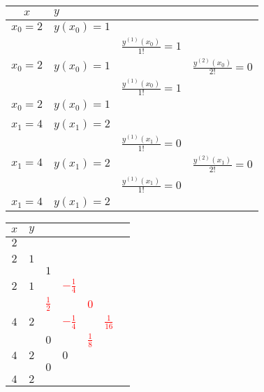 \renewcommand{\arraystretch}{1.0}
\begin{minipage}{10cm}
	\begin{tabular}{|c|lll|}
		\hline
		$x$		&\multicolumn{3}{l|}{$y$}\\
		\hline
		$x_0=2$	&$y(x_0)=1$	&							&\\
				&			&$\frac{y^{(1)}(x_0)}{1!}=1$&\\
		$x_0=2$	&$y(x_0)=1$	&							&$\frac{y^{(2)}(x_0)}{2!}=0$\\
				&			&$\frac{y^{(1)}(x_0)}{1!}=1$&\\
		$x_0=2$	&$y(x_0)=1$	&							&\\
				&			&							&\\
		$x_1=4$	&$y(x_1)=2$	&							&\\
				&			&$\frac{y^{(1)}(x_1)}{1!}=0$&\\
		$x_1=4$	&$y(x_1)=2$	&							&$\frac{y^{(2)}(x_1)}{2!}=0$\\
				&			&$\frac{y^{(1)}(x_1)}{1!}=0$&\\
		$x_1=4$	&$y(x_1)=2$	&							&\\
		\hline
	\end{tabular}
\end{minipage}
\hfill
\newcommand{\mycbox}[1]{\textcolor{red}{#1}}
\begin{minipage}{10cm}
	\begin{tabular}{|c|llllll|}
		\hline
		$x$	&\multicolumn{6}{l|}{$y$}\\
		\hline
		$2$	&\kreisS{$1$}{$a_0$}&			&			&			&				&\\
			&		&\kreisS{$1$}{$a_1$}		&			&			&				&\\
		$2$	&$1$	&			&\kreisS{$0$}{$a_2$}		&			&				&\\
			&		&$1$		&			&\kreisM{\mycbox{$-\frac 18$}}{$a_3$}&				&\\
		$2$	&$1$	&			&\mycbox{$-\frac 14$}&			&\kreisM{\mycbox{$\frac 1{16}$}}{$a_4$}	&\\
			&		&\mycbox{$\frac 12$}	&			&\mycbox{$0$}		&				&\kreisS{\mycbox{$0$}}{$a_5$}\\
		$4$	&$2$	&			&\mycbox{$-\frac 14$}&			&\mycbox{$\frac 1{16}$}	&\\
			&		&$0$		&			&\mycbox{$\frac 18$}	&				&\\
		$4$	&$2$	&			&$0$		&			&				&\\
			&		&$0$		&			&			&				&\\
		$4$	&$2$	&			&			&			&				&\\
		\hline
	\end{tabular}
\end{minipage}\\
\renewcommand{\arraystretch}{1.5}

